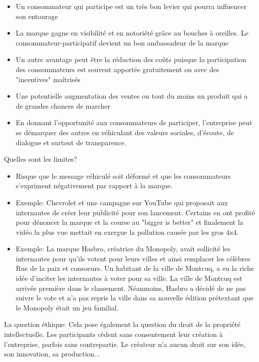 \begin{itemize}
    \item Un consommateur qui participe est un très bon levier qui pourra influencer son entourage
    \item La marque gagne en visibilité et en notoriété grâce au bouches à oreilles. Le consommateur-participatif devient un bon ambassadeur de la marque
    \item Un autre avantage peut être la réduction des coûts puisque la participation des consommateurs est souvent apportée gratuitement ou avec des "incentives" maîtrisés
    \item Une potentielle augmentation des ventes ou tout du moins un produit qui a de grandes chances de marcher
    \item En donnant l'opportunité aux consommateurs de participer, l'entreprise peut se démarquer des autres en véhiculant des valeurs sociales, d'écoute, de dialogue et surtout de transparence.\\
\end{itemize}

Quelles sont les limites?

\begin{itemize}
    \item Risque que le message véhiculé soit déformé et que les consommateurs s'expriment négativement par rapport à la marque.
    \item Exemple: Chevrolet et une campagne sur YouTube qui proposait aux internautes de créer leur publicité pour son lancement. Certains en ont profité pour dénoncer la marque et la course au "bigger is better" et finalement la vidéo la plus vue mettait en exergue la pollution causée par les gros 4x4.
    \item Exemple: La marque Hasbro, créatrice du Monopoly, avait sollicité les internautes pour qu'ils votent pour leurs villes et ainsi remplacer les célèbres Rue de la paix et consoeurs. Un habitant de la ville de Montcuq, a eu la riche idée d'inciter les internautes à voter pour sa ville. La ville de Montcuq est arrivée première dans le classement. Néanmoins, Hasbro a décidé de ne pas suivre le vote et n'a pas repris la ville dans sa nouvelle édition prétextant que le Monopoly était un jeu familial.\\
\end{itemize}

La question éthique: Cela pose également la question du droit de la propriété intellectuelle. Les participants cèdent sans consentement leur création à l'entreprise, parfois sans contrepartie. Le créateur n'a aucun droit sur son idée, son innovation, sa production...\\

